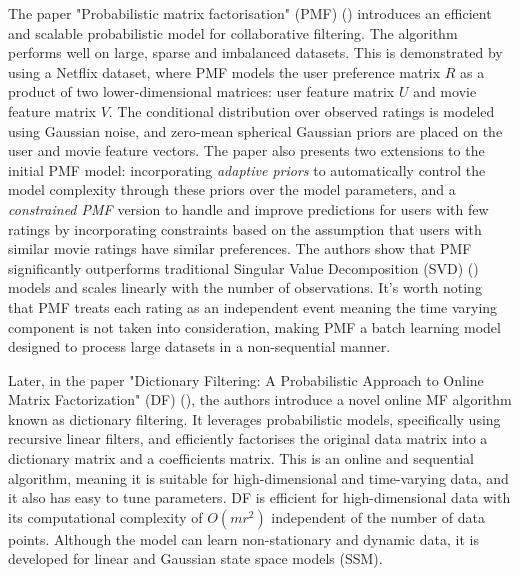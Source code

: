 \documentclass{mldsmsc}
\begin{document}
\noindent The paper "Probabilistic matrix factorisation" (PMF) (\cite{NIPS2007_d7322ed7}) introduces an efficient and scalable probabilistic model for collaborative filtering. The algorithm performs well on large, sparse and imbalanced datasets. This is demonstrated by using a Netflix dataset, where PMF models the user preference matrix $R$ as a product of two lower-dimensional matrices: user feature matrix $U$ and movie feature matrix $V$. The conditional distribution over observed ratings is modeled using Gaussian noise, and zero-mean spherical Gaussian priors are placed on the user and movie feature vectors. The paper also presents two extensions to the initial PMF model: incorporating \textit{adaptive priors} to automatically control the model complexity through these priors over the model parameters, and a \textit{constrained PMF} version to handle and improve predictions for users with few ratings by incorporating constraints based on the assumption that users with similar movie ratings have similar preferences. The authors show that PMF significantly outperforms traditional Singular Value Decomposition (SVD) (\cite{4ba978eb-d878-342d-a11e-6d7554474b2d}) models and scales linearly with the number of observations. It's worth noting that PMF treats each rating as an independent event meaning the time varying component is not taken into consideration, making PMF a batch learning model designed to process large datasets in a non-sequential manner. \newline

\noindent Later, in the paper "Dictionary Filtering: A Probabilistic Approach to Online Matrix Factorization" (DF) (\cite{cite-key}), the authors introduce a novel online MF algorithm known as dictionary filtering. It leverages probabilistic models, specifically using recursive linear filters, and efficiently factorises the original data matrix into a dictionary matrix and a coefficients matrix. This is an online and sequential algorithm, meaning it is suitable for high-dimensional and time-varying data, and it also has easy to tune parameters. DF is efficient for high-dimensional data with its computational complexity of $O(mr^2)$ independent of the number of data points. Although the model can learn non-stationary and dynamic data, it is developed for linear and Gaussian state space models (SSM). \newline
\end{document}
